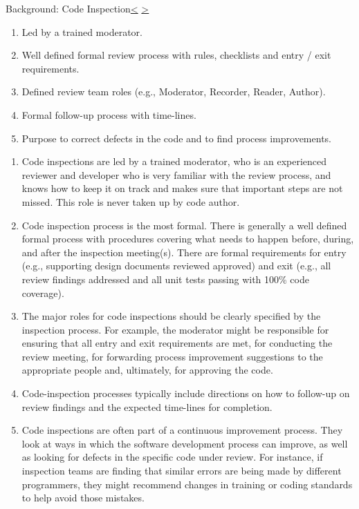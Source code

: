 \documentclass[12pt]{extarticle}
\newenvironment{instructionblock}{\Large\bgroup}{\egroup}
\begin{document}
\pagebreak
\begin{slide}{Background: Code Inspection}{\hyperref[slide 15]{\textless} \hyperref[slide 17]{\textgreater}}
	\vskip 10pt
	\begin{instructionblock}
	\begin{enumerate} 
	\setlength{\parskip}{0pt}
	\item Led by a trained moderator\cite{CodeInspection}.
	\item Well defined formal review process with rules, checklists and entry / exit requirements\cite{CodeInspection}.
	\item Defined review team roles (e.g., Moderator, Recorder, Reader, Author)\cite{CodeInspection}.
	\item Formal follow-up process with time-lines\cite{CodeInspection}.
	\item Purpose to correct defects in the code and to find process improvements\cite{CodeInspection}.
	\end{enumerate}
	\end{instructionblock}
\end{slide}
\begin{enumerate}
\item Code inspections are led by a trained moderator, who is an experienced reviewer and developer who is very familiar with the review process, and knows how to keep it on track and makes sure that important steps are not missed.  This role is never taken up by code author\cite{TechnicalReview}.
\item Code inspection process is the most formal.  There is generally a well defined formal process with procedures covering what needs to happen before, during, and after the inspection meeting(s). There are formal requirements for entry (e.g., supporting design documents reviewed approved) and exit (e.g., all review findings addressed and all unit tests passing with 100\% code coverage)\cite{TechnicalReview}.
\item The major roles for code inspections should be clearly specified by the inspection process.  For example, the moderator might be responsible for ensuring that all entry and exit requirements are met, for conducting the review meeting, for forwarding process improvement suggestions to the appropriate people and, ultimately, for approving the code\cite{TechnicalReview}.
\item Code-inspection processes typically include directions on how to follow-up on review findings and the expected time-lines for completion\cite{TechnicalReview}.
\item Code inspections are often part of a continuous improvement process.  They look at ways in which the software development process can improve, as well as looking for defects in the specific code under review.  For instance, if inspection teams are finding that similar errors are being made by different programmers, they might recommend changes in training or coding standards to help avoid those mistakes\cite{TechnicalReview}.
\end{enumerate}
\end{document}
